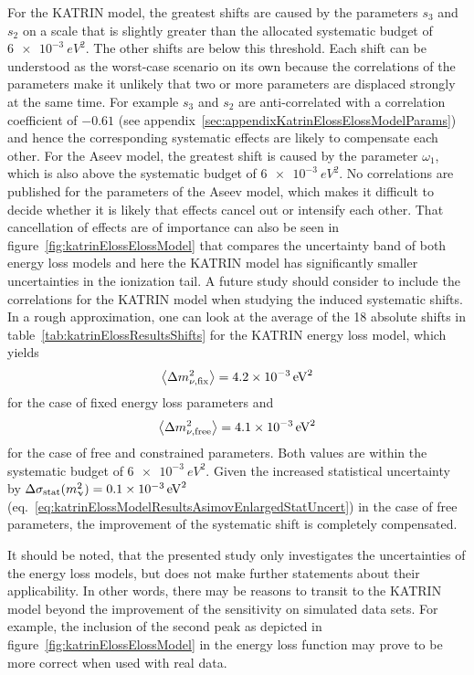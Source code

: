 For the KATRIN model, the greatest shifts are caused by the parameters $s_3$ and $s_2$ on a scale that is slightly greater than the allocated systematic budget of $\SI{6e-3}{eV^2}$. The other shifts are below this threshold. Each shift can be understood as the worst-case scenario on its own because the correlations of the parameters make it unlikely that two or more parameters are displaced strongly at the same time. For example $s_3$ and $s_2$ are anti-correlated with a correlation coefficient of $-0.61$ (see appendix~\ref{sec:appendixKatrinElossElossModelParams}) and hence the corresponding systematic effects are likely to compensate each other. For the Aseev model, the greatest shift is caused by the parameter $\omega_1$, which is also above the systematic budget of $\SI{6e-3}{eV^2}$. No correlations are published for the parameters of the Aseev model, which makes it difficult to decide whether it is likely that effects cancel out or intensify each other. That cancellation of effects are of importance can also be seen in figure~\ref{fig:katrinElossElossModel} that compares the uncertainty band of both energy loss models and here the KATRIN model has significantly smaller uncertainties in the ionization tail. A future study should consider to include the correlations for the KATRIN model when studying the induced systematic shifts. In a rough approximation, one can look at the average of the 18 absolute shifts in table~\ref{tab:katrinElossResultsShifts} for the KATRIN energy loss model, which yields 
\begin{equation*}
	\left\langle{\Delta m_{\nu,\mathrm{fix}}^2}\right\rangle = \SI{4.2e-3}{eV^2}
\end{equation*}
for the case of fixed energy loss parameters and 
\begin{equation*}
	\left\langle{\Delta m_{\nu,\mathrm{free}}^2}\right\rangle = \SI{4.1e-3}{eV^2}
\end{equation*}
for the case of free and constrained parameters. Both values are within the systematic budget of $\SI{6e-3}{eV^2}$. Given the increased statistical uncertainty by $\Delta\sigma_\mathrm{stat}(m_\upnu^2) = \SI{0.1e-3}{eV^2}$ (eq.~\ref{eq:katrinElossModelResultsAsimovEnlargedStatUncert}) in the case of free parameters, the improvement of the systematic shift is completely compensated. 

It should be noted, that the presented study only investigates the uncertainties of the energy loss models, but does not make further statements about their applicability. In other words, there may be reasons to transit to the KATRIN model beyond the improvement of the sensitivity on simulated data sets. For example, the inclusion of the second peak as depicted in figure~\ref{fig:katrinElossElossModel} in the energy loss function may prove to be more correct when used with real data.

